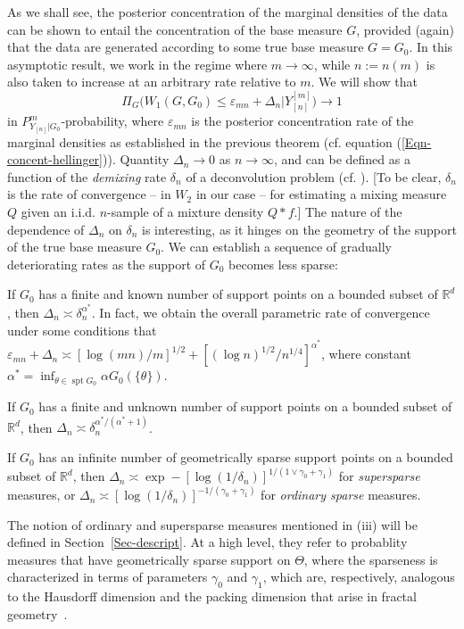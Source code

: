 \documentclass[MSNbibl,number,citesort]{arxbj}
\newcommand{\eqref}[1]{(\ref{#1})}
\newcommand{\real}{\mathbb{R}}
\newcommand{\supp}{\operatorname{spt}}
\newcommand{\PGz}{P_{Y_{[n]}|G_0}}
\newcommand{\YYn}{Y_{[n]}}
\newcommand{\epsmn}{\varepsilon_{mn}}
\begin{document}
As we shall see, the posterior concentration of the marginal
densities of the data can be shown to entail the concentration
of the base measure $G$, provided (again) that the data are generated
according to some true base measure $G = G_0$.
In this asymptotic result, we work in the regime where $m \rightarrow
\infty$,
while $n := n(m)$ is also taken to increase at an arbitrary rate
relative to $m$. We will show that
%
%
\begin{equation}
\label{Eqn-concentration} \Pi_G \bigl(W_1(G,G_0) \leq
\epsmn+ \Delta_n | \YYn^{[m]} \bigr) \longrightarrow1
\end{equation}
%
in $\PGz^m$-probability, where $\epsmn$ is the posterior concentration
rate of the marginal densities as established in the previous theorem
(cf. equation \eqref{Eqn-concent-hellinger}).
Quantity $\Delta_n \rightarrow0$ as $n\rightarrow\infty$,
and can be defined as a function of the \emph{demixing} rate $\delta_n$
of a deconvolution problem (cf. \cite
{Carroll-Hall-88,Zhang-90,Fan-91,Nguyen-11}).
[To be clear, $\delta_n$ is the rate of convergence -- in $W_2$ in our
case -- for estimating a mixing measure $Q$
given an i.i.d. $n$-sample of a mixture density $Q*f$.]
The nature of the dependence of $\Delta_n$ on $\delta_n$ is
interesting, as it hinges on
the geometry of the support of the true base measure $G_0$. We can establish
a sequence of gradually deteriorating rates as
the support of $G_0$ becomes less sparse:
%
\begin{longlist}[(iii)]
%
\item[(i)] If $G_0$ has a finite and known number of support points on
a bounded
subset of $\real^d$, then
$\Delta_n \asymp\delta_n^{{\alpha^*}}$. In fact, we obtain the overall
parametric rate of convergence under some conditions that
$\epsmn+ \Delta_n \asymp[\log(mn)/m]^{1/2} + [(\log
n)^{1/2}/n^{1/4}]^{{\alpha^*}}$,
where constant ${\alpha^*}= \inf_{\theta\in\supp G_0} \alpha G_0(\{
\theta\})$.
%
\item[(ii)] If
$G_0$ has a finite and unknown number of support points on a bounded
subset of $\real^d$, then
$\Delta_n \asymp\delta_n^{{\alpha^*}/({\alpha^*}+1)}$.
%
\item[(iii)] If $G_0$ has an infinite number of
geometrically sparse support points on a bounded subset of $\real^d$,
then $\Delta_n \asymp\exp-[\log(1/\delta_n)]^{1/(1\vee\gamma
_0+\gamma_1)}$
for \emph{supersparse} measures,
or $\Delta_n \asymp[\log(1/\delta_n)]^{-1/(\gamma_0+\gamma_1)}$
for \emph{ordinary sparse} measures.
\end{longlist}
%
The notion of ordinary and supersparse measures mentioned in (iii)
will be defined in Section~\ref{Sec-descript}. At a high level,
they refer to probablity measures that have geometrically sparse support
on $\Theta$, where the sparseness is characterized
in terms of parameters $\gamma_0$ and
$\gamma_1$, which are, respectively, analogous to the Hausdorff dimension
and the packing dimension that arise in fractal
geometry~\cite{Falconer,Garcia-etal-07}.
\end{document}
